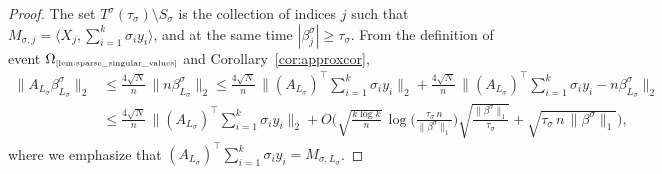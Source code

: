 \documentclass[11pt]{amsart}
\theoremstyle{definition}
\theoremstyle{plain}
\begin{document}
\begin{proof}
The set $T^\sigma(\tau_\sigma) \setminus S_\sigma$ is the collection of indices $j$ such that $M_{\sigma,j} = \langle X_j,\sum_{i=1}^k \sigma_i y_i\rangle$,
and at the same time $|\beta_j^\sigma|
\ge \tau_\sigma$.
From the definition of event $\Omega_{\text{\tiny\ref{lem:sparse_singular_values}}}$
and Corollary~\ref{cor:approxcor},
\begin{align*}
    \big\|A_{L_\sigma} \beta_{L_\sigma}^\sigma\big\|_2 
&\le 
    \frac{4\sqrt{N}}{n}\,\| n\beta_{L_\sigma}^\sigma\|_2 
\leq
\frac{4\sqrt{N}}{n}\,
\Big\|(A_{L_\sigma})^\top \sum_{i=1}^k \sigma_i y_i\Big\|_2
+
\frac{4\sqrt{N}}{n}\,\Big\|(A_{L_\sigma})^\top \sum_{i=1}^k \sigma_i y_i
-n\beta_{L_\sigma}^\sigma\Big\|_2\\
&\leq 
\frac{4\sqrt{N}}{n}\,
\Big\|(A_{L_\sigma})^\top \sum_{i=1}^k \sigma_i y_i\Big\|_2
+
O
  \bigg(\sqrt{\frac{k\log k}{n}}\,\log\Big(\frac{\tau_\sigma\,n}{\|\beta^\sigma\|_1}\Big) \sqrt{\frac{\|\beta^\sigma\|_1}{\tau_\sigma}}
  +\sqrt{\tau_\sigma\,n\,\|\beta^\sigma\|_1}\bigg),
\end{align*}
where we emphasize that
$(A_{L_\sigma})^\top \sum_{i=1}^k \sigma_i y_i 
= M_{\sigma,L_\sigma}$. 

\bigskip


\end{proof}
\end{document}
